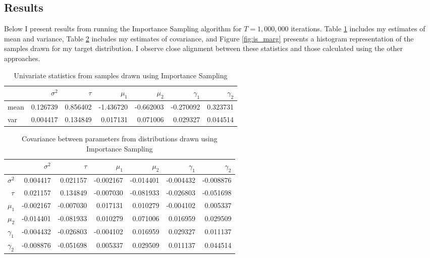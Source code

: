 \documentclass{article}
\begin{document}
\subsection{Results}
Below I present results from running the Importance Sampling algorithm for $T=1,000,000$ iterations. Table \ref{tab:is_univar} includes my estimates of mean and variance, Table \ref{tab:is_covar} includes my estimates of covariance, and Figure \ref{fig:is_marg} presents a histogram representation of the samples drawn for my target distribution. I observe close alignment between these statistics and those calculated using the other approaches.

\begin{table}[H]
  \begin{center}
    \begin{tabular}{lrrrrrr}
      &$\sigma^2$ & $\tau$ & $\mu_1$ & $\mu_2$ & $\gamma_1$ & $\gamma_2$ \\
      \midrule
      mean &  0.126739 &  0.856402 & -1.436720 & -0.662003 & -0.270092 &  0.323731 \\
      var  &  0.004417 &  0.134849 &  0.017131 &  0.071006 &  0.029327 &  0.044514 \\
      \bottomrule
      \end{tabular}
  \end{center}
  \caption{\label{tab:is_univar} Univariate statistics from samples drawn using Importance Sampling}
\end{table}

\begin{table}[H]
  \begin{center}
    \begin{tabular}{lrrrrrr}
      {} & $\sigma^2$ & $\tau$ & $\mu_1$ & $\mu_2$ & $\gamma_1$ & $\gamma_2$ \\
      \midrule
      $\sigma^2$&   0.004417 &  0.021157 & -0.002167 & -0.014401 & -0.004432 & -0.008876 \\\
      $\tau$  &    0.021157 &  0.134849 & -0.007030 & -0.081933 & -0.026803 & -0.051698 \\
      $\mu_1$  &  -0.002167 & -0.007030 &  0.017131 &  0.010279 & -0.004102 &  0.005337 \\
      $\mu_2$  &  -0.014401 & -0.081933 &  0.010279 &  0.071006 &  0.016959 &  0.029509 \\
      $\gamma_1$&  -0.004432 & -0.026803 & -0.004102 &  0.016959 &  0.029327 &  0.011137 \\
      $\gamma_2$ &   -0.008876 & -0.051698 &  0.005337 &  0.029509 &  0.011137 &  0.044514 \\
      \bottomrule
      \end{tabular}
  \end{center}
  \caption{\label{tab:is_covar} Covariance between parameters from distributions drawn using Importance Sampling}
\end{table}
\end{document}
